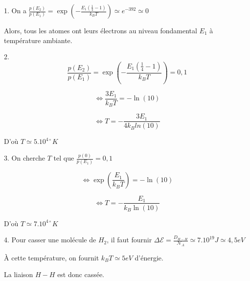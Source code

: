 \documentclass[a4paper,12pt]{book}
\begin{document}
\par 1. On a $\frac{p(E_2)}{p(E_1)} = \exp\left(-\frac{E_1(\frac{1}{4}-1)}{k_B T}\right)\simeq e^{-392}\simeq 0$
\par Alors, tous les atomes ont leurs électrons au niveau fondamental $E_1$ à température ambiante.
\par 2. $$\frac{p(E_2)}{p(E_1)} = \exp\left(-\frac{E_1(\frac{1}{4}-1)}{k_BT}\right) = 0,1$$
\par $$\Leftrightarrow \frac{3E_1}{k_BT}=-\ln(10)$$
\par $$\Leftrightarrow T = -\frac{3E_1}{4k_Bln(10)}$$
\par D'où $T\simeq 5.10^{4\circ} K$
\par 3. On cherche $T$ tel que $\frac{p(0)}{p(E_1)}=0,1$
\par $$\Leftrightarrow \exp\left(\frac{E_1}{k_BT}\right) = -\ln(10) $$
\par $$\Leftrightarrow T = -\frac{E_1}{k_B\ln(10)}$$
\par D'où $T\simeq 7.10^{4\circ}K$
\par 4. Pour casser une molécule de $H_2$, il faut fournir $\Delta\mathcal{E} = \frac{D_{H-H}}{\mathcal{N}_A} \simeq 7.10^{19}J\simeq 4,5 eV$
\par À cette température, on fournit $k_BT\simeq 5 eV$ d'énergie.
\par La liaison $H-H$ est donc cassée.
\end{document}
